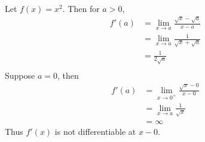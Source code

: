 \documentclass{article}
\begin{document}
\begin{example}
Let $f(x) = x^2$. Then for $a > 0$,
\begin{align*}
    f'(a) &= \lim_{x\to a}\frac{\sqrt{x} - \sqrt{a}}{x-a}\\
    &= \lim_{x\to a}\frac{1}{\sqrt{x} + \sqrt{a}} \tag{Rationalize the Numerator}\\
    &= \frac{1}{2\sqrt{a}}\\
\end{align*}
Suppose $a = 0$, then \begin{align*}
    f'(a) &= \lim_{x\to 0^+}\frac{\sqrt{x} - 0}{x-0}\\
    &= \lim_{x\to a}\frac{1}{\sqrt{x}}\\
    &= \infty
\end{align*}
Thus $f'(x)$ is not differentiable at $x - 0$.
\end{example}
\end{document}
